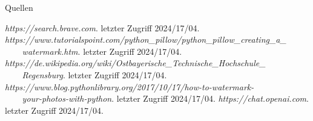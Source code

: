 \documentclass[a4paper,
	DIV=13,
	14pt,
	BCOR=10mm,
	department=FakEI,
	twoside,
	parskip=half,
	automark,
	aspectratio=169
]{beamer}
\begin{document}
\begin{frame}
\end{frame}

\begin{frame}{Quellen}
	\begin{thebibliography}{99}
		{\selectfont\small
			 \textit{https://search.brave.com}. letzter Zugriff 2024/17/04.
			 \textit{https://www.tutorialspoint.com/python\_pillow/python\_pillow\_creating\_a\_ \\ \ \ \ \ watermark.htm}. letzter Zugriff 2024/17/04.
			 \textit{https://de.wikipedia.org/wiki/Ostbayerische\_Technische\_Hochschule\_ \\ \ \ \ \ Regensburg}. letzter Zugriff 2024/17/04.
			 \textit{https://www.blog.pythonlibrary.org/2017/10/17/how-to-watermark-\\ \ \ \ \ your-photos-with-python}. letzter Zugriff 2024/17/04.
			 \textit{https://chat.openai.com}. letzter Zugriff 2024/17/04.
		}
	\end{thebibliography}
\end{frame}
\end{document}
